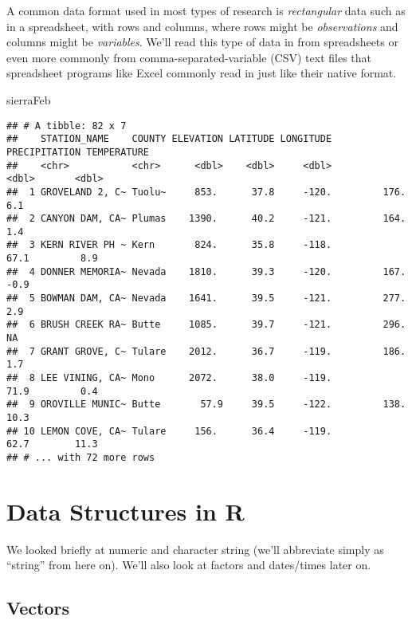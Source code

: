 \documentclass[
]{book}
\newenvironment{Shaded}{\begin{snugshade}}{\end{snugshade}}
\newcommand{\NormalTok}[1]{#1}
\begin{document}
A common data format used in most types of research is \emph{rectangular} data such as in a spreadsheet,
with rows and columns, where rows might be \emph{observations} and columns might be \emph{variables}.
We'll read this type of data in from spreadsheets or even more commonly from comma-separated-variable (CSV)
text files that spreadsheet programs like Excel commonly read in just like their native format.

\begin{Shaded}
\begin{Highlighting}[]
\NormalTok{sierraFeb}
\end{Highlighting}
\end{Shaded}

\begin{verbatim}
## # A tibble: 82 x 7
##    STATION_NAME    COUNTY ELEVATION LATITUDE LONGITUDE PRECIPITATION TEMPERATURE
##    <chr>           <chr>      <dbl>    <dbl>     <dbl>         <dbl>       <dbl>
##  1 GROVELAND 2, C~ Tuolu~     853.      37.8     -120.         176.          6.1
##  2 CANYON DAM, CA~ Plumas    1390.      40.2     -121.         164.          1.4
##  3 KERN RIVER PH ~ Kern       824.      35.8     -118.          67.1         8.9
##  4 DONNER MEMORIA~ Nevada    1810.      39.3     -120.         167.         -0.9
##  5 BOWMAN DAM, CA~ Nevada    1641.      39.5     -121.         277.          2.9
##  6 BRUSH CREEK RA~ Butte     1085.      39.7     -121.         296.         NA  
##  7 GRANT GROVE, C~ Tulare    2012.      36.7     -119.         186.          1.7
##  8 LEE VINING, CA~ Mono      2072.      38.0     -119.          71.9         0.4
##  9 OROVILLE MUNIC~ Butte       57.9     39.5     -122.         138.         10.3
## 10 LEMON COVE, CA~ Tulare     156.      36.4     -119.          62.7        11.3
## # ... with 72 more rows
\end{verbatim}

\hypertarget{data-structures-in-r}{%
\section{Data Structures in R}\label{data-structures-in-r}}

We looked briefly at numeric and character string (we'll abbreviate simply as ``string'' from here on).
We'll also look at factors and dates/times later on.

\hypertarget{vectors}{%
\subsection{Vectors}\label{vectors}}
\end{document}
